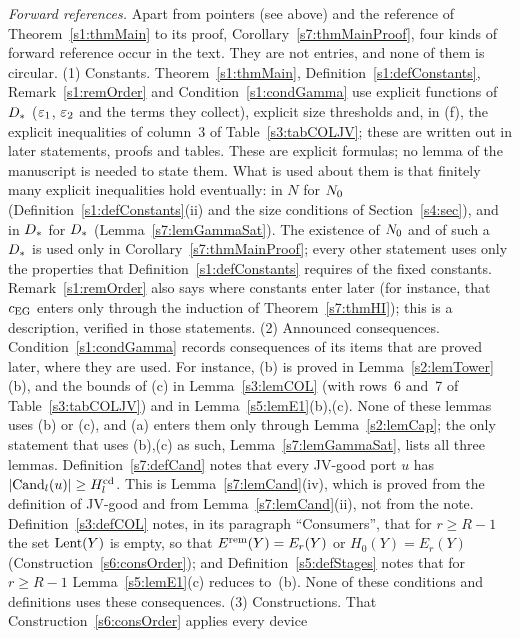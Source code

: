 \emph{Forward references.} Apart from pointers (see above) and the reference of
Theorem~\ref{s1:thmMain} to its proof, Corollary~\ref{s7:thmMainProof}, four
kinds of forward reference occur in the text. They are not entries, and none of
them is circular.
(1) Constants. Theorem~\ref{s1:thmMain}, Definition~\ref{s1:defConstants},
Remark~\ref{s1:remOrder} and Condition~\ref{s1:condGamma} use explicit
functions of $D_{*}$ ($\varepsilon_{1}$, $\varepsilon_{2}$ and the terms they collect),
explicit size thresholds and, in (f), the explicit inequalities of
column~3 of Table~\ref{s3:tabCOLJV}; these are written out in later
statements, proofs and tables.
These are explicit formulas; no lemma of the manuscript is needed to state them.
What is used about them is that finitely many explicit inequalities hold
eventually: in $N$ for $N_{0}$ (Definition~\ref{s1:defConstants}(ii) and the
size conditions of Section~\ref{s4:sec}), and in $D_{*}$ for $D_{*}$
(Lemma~\ref{s7:lemGammaSat}). The existence of $N_{0}$ and of such a $D_{*}$
is used only in Corollary~\ref{s7:thmMainProof}; every other statement uses only
the properties that Definition~\ref{s1:defConstants} requires of the fixed
constants. Remark~\ref{s1:remOrder} also says where
constants enter later (for instance, that $c_{\mathrm{EG}}$ enters only through the
induction of Theorem~\ref{s7:thmHI}); this is a description, verified in those
statements.
(2) Announced consequences. Condition~\ref{s1:condGamma} records consequences
of its items that are proved later, where they are used. For instance,
(b) is proved in Lemma~\ref{s2:lemTower}(b), and the bounds of (c)
in Lemma~\ref{s3:lemCOL} (with rows~6 and~7 of Table~\ref{s3:tabCOLJV}) and in
Lemma~\ref{s5:lemE1}(b),(c). None of these lemmas uses (b) or (c), and
(a) enters them only through Lemma~\ref{s2:lemCap}; the only statement
that uses (b),(c) as such, Lemma~\ref{s7:lemGammaSat}, lists all three
lemmas. Definition~\ref{s7:defCand} notes that every JV-good port $u$ has
$|\mathrm{Cand}_l(u)|\ge H^{\mathrm{cd}}_l$. This is Lemma~\ref{s7:lemCand}(iv), which is proved
from the definition of JV-good and from Lemma~\ref{s7:lemCand}(ii), not from the
note. Definition~\ref{s3:defCOL} notes, in its paragraph ``Consumers'', that
for $r\ge R-1$ the set $\mathrm{Lent}(Y)$ is empty, so that $E^{\mathrm{rem}}(Y)=E_r(Y)$ or
$H_0(Y)=E_r(Y)$ (Construction~\ref{s6:consOrder}); and
Definition~\ref{s5:defStages} notes that for $r\ge R-1$
Lemma~\ref{s5:lemE1}(c) reduces to~(b). None of these conditions and
definitions uses these consequences.
(3) Constructions. That Construction~\ref{s6:consOrder} applies every device
